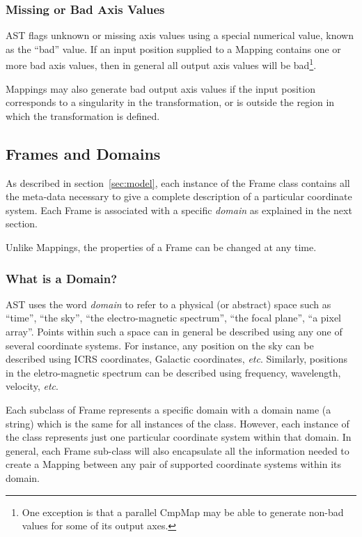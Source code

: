 \documentclass[final,authoryear,5p,times,twocolumn]{elsarticle}
\begin{document}
\subsubsection{Missing or Bad Axis Values}
\label{sec:bad}
AST flags unknown or missing axis values using a special numerical value,
known as the ``bad'' value. If an input position supplied to a Mapping
contains one or more bad axis values, then in general all output axis
values will be bad\footnote{One exception is that a parallel CmpMap may
be able to generate non-bad values for some of its output axes.}.

Mappings may also generate bad output axis values if the input position
corresponds to a singularity in the transformation, or is outside the
region in which the transformation is defined.

\subsection{Frames and Domains}
As described in section~\ref{sec:model}, each instance of the Frame class
contains all the meta-data necessary to give a complete description of
a particular coordinate system. Each Frame is associated with a specific
\emph{domain} as explained in the next section.

Unlike Mappings, the properties of a Frame can be changed at any time.

\subsubsection{What is a Domain?}
\label{sec:domain}
AST uses the word \emph{domain} to refer to a physical (or abstract)
space such as ``time'', ``the sky'', ``the electro-magnetic spectrum'',
``the focal plane'', ``a pixel array''. Points within such a space can in
general be described using any one of several coordinate systems. For
instance, any position on the sky can be described using ICRS
coordinates, Galactic coordinates, \emph{etc}. Similarly, positions in
the eletro-magnetic spectrum can be described using frequency,
wavelength, velocity, \emph{etc}.

Each subclass of Frame represents a specific domain with a domain name (a
string) which is the same for all instances of the class. However, each
instance of the class represents just one particular coordinate system
within that domain. In general, each Frame sub-class will also
encapsulate all the information needed to create a Mapping between any
pair of supported coordinate systems within its domain.
\end{document}
